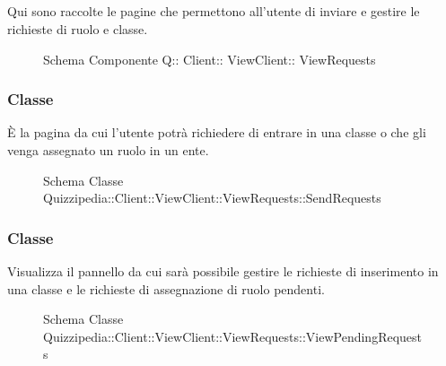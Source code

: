 \subsection{}
Qui sono raccolte le pagine che permettono all'utente di inviare e gestire le richieste di ruolo e classe.
\begin{figure}[H]
\centering
\noindent{}
\caption[Schema Componente Quizzipedia::Client::ViewClient::ViewRequests]{Schema Componente Q:: Client:: ViewClient:: ViewRequests}
\end{figure}
\subsubsection{Classe }
È la pagina da cui l'utente potrà richiedere di entrare in una classe o che gli venga assegnato un ruolo in un ente.
\begin{figure}[H]
\centering
\noindent{}
\caption[Schema Classe SendRequests]{Schema Classe Quizzipedia::Client::ViewClient::ViewRequests::SendRequests}
\end{figure}
\subsubsection{Classe }
Visualizza il pannello da cui sarà possibile gestire le richieste di inserimento in una classe e le richieste di assegnazione di ruolo pendenti.
\begin{figure}[H]
\centering
\noindent{}
\caption[Schema Classe ViewPendingRequests]{Schema Classe Quizzipedia::Client::ViewClient::ViewRequests::ViewPendingRequests}
\end{figure}
